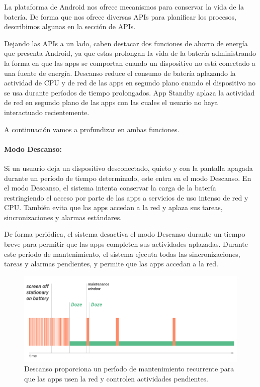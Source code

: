 

La plataforma de Android nos ofrece mecanismos para conservar
 la vida de la batería. De forma que nos ofrece diversas APIs para
 planificar los procesos, describimos algunas en la sección de APIs.

Dejando las APIs a un lado, caben destacar  dos funciones de
 ahorro de energía que presenta Android, ya que estas prolongan 
la vida de la batería administrando la forma en que las apps se 
comportan cuando un dispositivo no está conectado a una 
fuente de energía. Descanso reduce el consumo de batería
 aplazando la actividad de CPU y de red de las apps en segundo
 plano cuando el dispositivo no se usa durante períodos de
 tiempo prolongados. App Standby aplaza la actividad de red 
en segundo plano de las apps con las cuales el usuario no haya
 interactuado recientemente.

A continuación vamos a profundizar en ambas funciones.

\paragraph{Modo Descanso:}

Si un usuario deja un dispositivo desconectado, quieto y con la 
pantalla apagada durante un período de tiempo determinado, este 
entra en el modo Descanso. En el modo Descanso, el sistema intenta 
conservar la carga de la batería restringiendo el acceso por parte de
 las apps a servicios de uso intenso de red y CPU. También evita que
 las apps accedan a la red y aplaza sus tareas, sincronizaciones
 y alarmas estándares.

De forma periódica, el sistema desactiva el modo Descanso durante 
un tiempo breve para permitir que las apps completen sus actividades 
aplazadas. Durante este período de mantenimiento, el sistema ejecuta
 todas las sincronizaciones, tareas y alarmas pendientes, y permite 
que las apps accedan a la red.
\begin{figure}[h]
\includegraphics[scale=0.20]{imagenes/doze.png} 
\caption{Descanso proporciona un período de mantenimiento
 recurrente para que las apps usen la red y controlen actividades pendientes.}
\end{figure}



